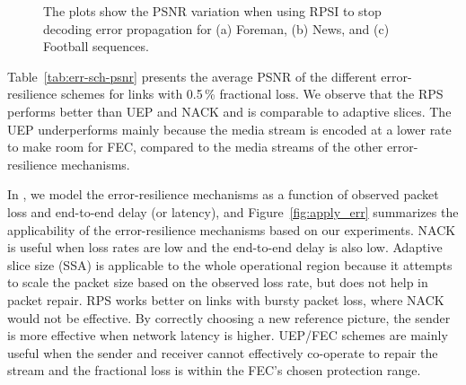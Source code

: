 \begin{figure}[!t]
\caption{The plots show the PSNR variation when using RPSI to stop decoding
error propagation for (a) Foreman, (b) News, and (c) Football sequences.}
\label{fig:rpsi_sim}
\end{figure}

Table~\ref{tab:err-sch-psnr} presents the average PSNR of the different 
error-resilience schemes for links with 0.5\,\% fractional loss. We observe that the
RPS performs better than UEP and NACK and is comparable to adaptive slices.
The UEP underperforms mainly because the media stream is encoded at a lower
rate to make room for FEC, compared to the media streams of the other
error-resilience mechanisms.

\begin{table}
\caption{Comparing the performance of different error-resilience
schemes on three different types of YUV sequences~\cite{YUV_seq}. The link
loss rate is 0.5\,\% at each 3G link.}
\label{tab:err-sch-psnr}
\end{table}

In , we model the error-resilience mechanisms as a function of
observed packet loss and end-to-end delay (or latency), and
Figure~\ref{fig:apply_err} summarizes the applicability of the
error-resilience mechanisms based on our experiments. NACK is useful when loss
rates are low and the end-to-end delay is also low. Adaptive slice size (SSA)
is applicable to the whole operational region because it attempts to scale the
packet size based on the observed loss rate, but does not help in packet
repair. RPS works better on links with bursty packet loss, where NACK would
not be effective. By correctly choosing a new reference picture, the sender is
more effective when network latency is higher. UEP/FEC schemes are mainly useful when
the sender and receiver cannot effectively co-operate to repair the stream and
the fractional loss is within the FEC's chosen protection range.

